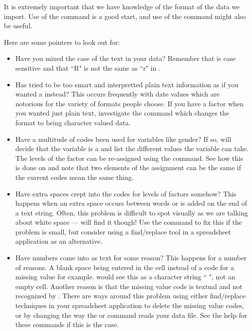 It is extremely important that we have knowledge of the format of the data we import. Use of the  command is a good start, and use of the  command might also be useful. 
 
Here are some pointers to look out for:\begin{itemize} 
 
\item Have you mixed the case of the text in your data? Remember that \R{} is case sensitive and that ``R" is not the same as ``r" in \R{}. 
 
\item Has \R{} tried to be too smart and interpretted plain text information as if you wanted a  instead? This occurs frequently with date values which are notorious for the variety of formats people choose. If you have a factor when you wanted just plain text, investigate the  command which changes the format to being character valued data. 
\item Have a multitude of codes been used for variables like gender? If so, \R{} will decide that the variable is a  and list the different values the variable can take. The levels of the factor can be re-assigned using the  command. See how this is done on \pageref{UseOfLevels} and note that two elements of the assignment can be the same if the current codes mean the same thing. 
\item Have extra spaces crept into the codes for levels of factors somehow? This happens when an extra space occurs between words or is added on the end of a text string. Often, this problem is difficult to spot visually as we are talking about white space --- \R{} will find it though! Use the  command to fix this if the problem is small, but consider using a find/replace tool in a spreadsheet application as an alternative. 
\item Have numbers come into \R{} as text for some reason? This happens for a number of reasons. A blank space being entered in the cell instead of a code for a missing value for example. \R{} would see this as a character string `` ", not an empty cell. Another reason is that the missing value code is textual and not recognized by \R{}. There are ways around this problem using either find/replace techniques in your spreadsheet application to delete the missing value codes, or by changing the way the  or  command reads your data file. See the help for these commands if this is the case. 
\end{itemize} 
 
